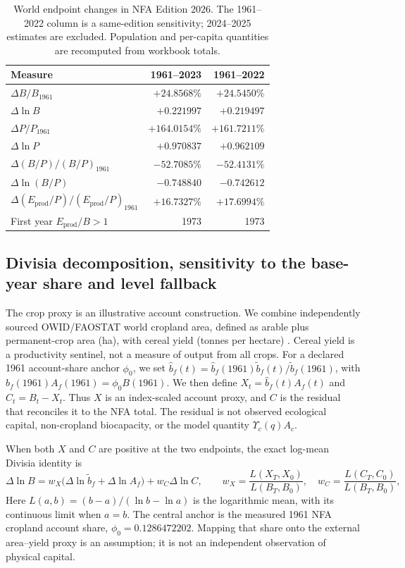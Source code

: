 \documentclass[11pt,a4paper]{article}
\newcommand{\Ups}{\Upsilon_c}
\begin{document}
\begin{table}[htbp]
\centering\small
\caption{World endpoint changes in NFA Edition 2026. The 1961--2022 column is a same-edition sensitivity; 2024--2025 estimates are excluded. Population and per-capita quantities are recomputed from workbook totals.}
\label{tab:si_nfa_endpoints}
\begin{tabularx}{\textwidth}{>{\raggedright\arraybackslash}Xrr}
\toprule
Measure & 1961--2023 & 1961--2022 \\
\midrule
$\Delta B/B_{1961}$ & $+24.8568\%$ & $+24.5450\%$ \\
$\Delta\ln B$ & $+0.221997$ & $+0.219497$ \\
$\Delta P/P_{1961}$ & $+164.0154\%$ & $+161.7211\%$ \\
$\Delta\ln P$ & $+0.970837$ & $+0.962109$ \\
$\Delta(B/P)/(B/P)_{1961}$ & $-52.7085\%$ & $-52.4131\%$ \\
$\Delta\ln(B/P)$ & $-0.748840$ & $-0.742612$ \\
$\Delta(E_{\mathrm{prod}}/P)/(E_{\mathrm{prod}}/P)_{1961}$ & $+16.7327\%$ & $+17.6994\%$ \\
First year $E_{\mathrm{prod}}/B>1$ & 1973 & 1973 \\
\bottomrule
\end{tabularx}
\end{table}

\newpage
\subsection{Divisia decomposition, sensitivity to the base-year share and level fallback}\label{si:divisia}

The crop proxy is an illustrative account construction. We combine independently sourced OWID/FAOSTAT world cropland area, defined as arable plus permanent-crop area (ha), with cereal yield (tonnes per hectare) \citep{OWIDCereal2026,OWIDCropland2026}. Cereal yield is a productivity sentinel, not a measure of output from all crops. For a declared 1961 account-share anchor $\phi_0$, we set $\hat b_f(t)=\hat b_f(1961)\tilde b_f(t)/\tilde b_f(1961)$, with $\hat b_f(1961)A_f(1961)=\phi_0B(1961)$. We then define $X_t=\hat b_f(t)A_f(t)$ and $C_t=B_t-X_t$. Thus $X$ is an index-scaled account proxy, and $C$ is the residual that reconciles it to the NFA total. The residual is not observed ecological capital, non-cropland biocapacity, or the model quantity $\Ups(q)A_c$.

When both $X$ and $C$ are positive at the two endpoints, the exact log-mean Divisia identity is
\begin{equation}
\Delta\ln B=w_X\bigl(\Delta\ln\tilde b_f+\Delta\ln A_f\bigr)+w_C\Delta\ln C,
\qquad w_X=\frac{L(X_T,X_0)}{L(B_T,B_0)},\quad w_C=\frac{L(C_T,C_0)}{L(B_T,B_0)},
\end{equation}
Here $L(a,b)=(b-a)/(\ln b-\ln a)$ is the logarithmic mean, with its continuous limit when $a=b$. The central anchor is the measured 1961 NFA cropland account share, $\phi_0=0.1286472202$. Mapping that share onto the external area--yield proxy is an assumption; it is not an independent observation of physical capital.
\end{document}

